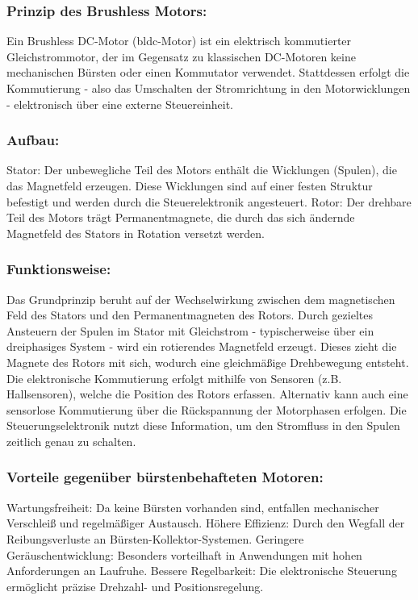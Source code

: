 \documentclass[a4paper,12pt]{article}
\begin{document}
            \subsubsection{Prinzip des Brushless Motors:}
            \label{sec:Prinzip des Brushless Motors}
            Ein Brushless DC-Motor (\gls{bldc}-Motor) ist ein elektrisch kommutierter Gleichstrommotor, der im Gegensatz zu klassischen DC-Motoren keine mechanischen Bürsten oder einen Kommutator verwendet. Stattdessen erfolgt die Kommutierung - also das Umschalten der Stromrichtung in den Motorwicklungen - elektronisch über eine externe Steuereinheit.

            \subsubsection{Aufbau:}
            \label{sec:Aufbau des Motors}
            Stator: Der unbewegliche Teil des Motors enthält die Wicklungen (Spulen), die das Magnetfeld erzeugen. Diese Wicklungen sind auf einer festen Struktur befestigt und werden durch die Steuerelektronik angesteuert.\newline
            Rotor:
            Der drehbare Teil des Motors trägt Permanentmagnete, die durch das sich ändernde Magnetfeld des Stators in Rotation versetzt werden.
            \subsubsection{Funktionsweise:}
            \label{sec:Funktionsweise des Motors}
            Das Grundprinzip beruht auf der Wechselwirkung zwischen dem magnetischen Feld des Stators und den Permanentmagneten des Rotors. Durch gezieltes Ansteuern der Spulen im Stator mit Gleichstrom - typischerweise über ein dreiphasiges System - wird ein rotierendes Magnetfeld erzeugt. Dieses zieht die Magnete des Rotors mit sich, wodurch eine gleichmäßige Drehbewegung entsteht.
            Die elektronische Kommutierung erfolgt mithilfe von Sensoren (z.B. Hallsensoren), welche die Position des Rotors erfassen. Alternativ kann auch eine sensorlose Kommutierung über die Rückspannung der Motorphasen erfolgen. Die Steuerungselektronik nutzt diese Information, um den Stromfluss in den Spulen zeitlich genau zu schalten.
            \subsubsection{Vorteile gegenüber bürstenbehafteten Motoren:}
            \label{sec:Vorteile gegenüber bürstenbehafteten Motoren}
            Wartungsfreiheit: Da keine Bürsten vorhanden sind, entfallen mechanischer Verschleiß und regelmäßiger Austausch.\newline
            Höhere Effizienz: Durch den Wegfall der Reibungsverluste an Bürsten-Kollektor-Systemen.\newline
            Geringere Geräuschentwicklung: Besonders vorteilhaft in Anwendungen mit hohen Anforderungen an Laufruhe.\newline
            Bessere Regelbarkeit: Die elektronische Steuerung ermöglicht präzise Drehzahl- und Positionsregelung.\newline
\end{document}
